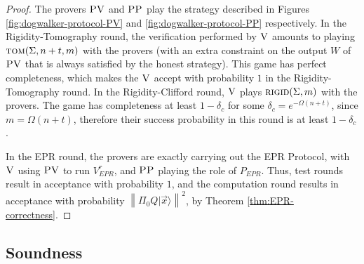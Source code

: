 \documentclass[11pt,letter]{article}
\theoremstyle{remark}
\theoremstyle{definition}
\newcommand{\ket}[1]{|#1\rangle}
\newcommand{\rigid}{\textsc{rigid}}
\newcommand{\tom}{\textsc{tom}}
\newcommand{\ver}{\textsc{V}}
\newcommand{\pv}{\textsc{PV}}
\newcommand{\pp}{\textsc{PP}}
\newcommand{\norm}[1]{\left\|#1\right\|}
\begin{document}
\begin{proof}
The provers $\pv$ and $\pp$ play the strategy described in Figures
  \ref{fig:dogwalker-protocol-PV} and \ref{fig:dogwalker-protocol-PP}
  respectively. In the Rigidity-Tomography round, the verification performed by
  $\ver$ amounts to playing $\tom(\Sigma,n+t,m)$ with the provers (with an extra
  constraint on the output $W$ of $\pv$ that is always satisfied by the honest
  strategy). This game has perfect
  completeness, which makes the $\ver$
  accept with probability $1$ in the Rigidity-Tomography round.
  In the Rigidity-Clifford round, $\ver$ plays $\rigid(\Sigma,m)$
  with the provers. The game
  has completeness at least $1-\delta_c$ for some $\delta_c=e^{-\Omega(n+t)}$,
  since $m=\Omega(n+t)$, therefore their success probability in this round is
  at least $1-\delta_c$.

In the EPR round, the provers are exactly carrying out the EPR Protocol, with $\ver$ using $\pv$ to run $V_{EPR}^r$, and $\pp$ playing the role of $P_{EPR}$. Thus, test rounds result in acceptance with probability $1$, and the computation round results in acceptance with probability $\norm{\Pi_0 Q\ket{\vec{x}}}^2$, by Theorem \ref{thm:EPR-correctness}. 
\end{proof}


\subsection{Soundness}
\end{document}
